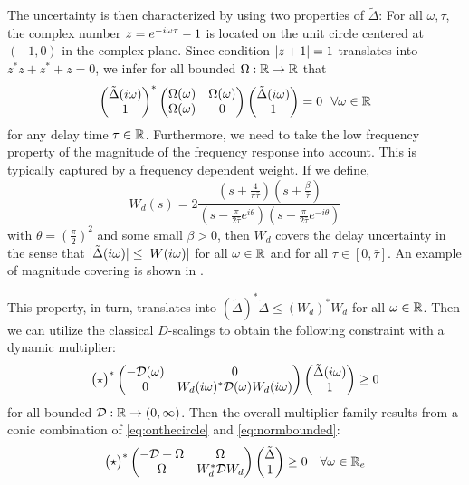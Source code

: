 The uncertainty is then characterized by using two properties of $\tilde \Delta$: For all 
$\omega,\tau$, the complex number $z=e^{-i\omega{\tau}}-1$ is located on the unit circle centered 
at $(-1,0)$ in the complex plane. Since condition $\displaystyle \left|z+1\right|=1$ translates into $z^*z+z^*+z=0$, 
we infer for all bounded $\Omega:\mathbb{R}\to\mathbb{R}$ that
\begin{equation}
\begin{pmatrix}\tilde{\Delta}(i\omega)\\1\end{pmatrix}^*\begin{pmatrix}\Omega(\omega) &\Omega(\omega)\\ \Omega(\omega) &0\end{pmatrix}
\begin{pmatrix}\tilde{\Delta}(i\omega)\\1\end{pmatrix} = 0\ \ \forall\omega\in\mathbb{R}
\label{eq:onthecircle}
\end{equation}
for any delay time $\tau\in\mathbb{R}$. Furthermore, we need to take the low frequency property of the 
magnitude of the frequency response into account. This is typically captured by a frequency dependent 
weight. If we define,
\begin{equation*}
W_d(s)= 2\frac{(s+ \frac{4}{\pi\bar{\tau}}) (s+ \frac{\beta}{\bar{\tau}})}%
{(s-\frac{\pi}{2\bar{\tau}}e^{i\theta})(s-\frac{\pi}{2\bar{\tau}}e^{-i\theta})}
\end{equation*}
with $\theta=\left( \frac{\pi}{2}\right)^2$ and some small $\beta>0$, then $W_d$ covers the delay 
uncertainty in the sense that $|\tilde{\Delta}(i\omega)|\leq |W(i\omega)|$ for all $\omega\in\mathbb{R}$ and 
for all $\tau\in [0,\bar{\tau}]$. An example of magnitude covering is shown in .

This property, in turn, translates into $(\tilde{\Delta})^*\tilde{\Delta}\leq (W_d)^*W_d$ for all 
$\omega\in\mathbb{R}$. Then we can utilize the classical $D$-scalings to obtain the following constraint 
with a dynamic multiplier:
\begin{equation}
\begin{pmatrix}\star\end{pmatrix}^*\begin{pmatrix}-\mathcal{D}(\omega) &0\\0 &W_d(i\omega)^*\mathcal{D}(\omega)W_d(i\omega)\end{pmatrix}
\begin{pmatrix}\tilde{\Delta}(i\omega)\\1\end{pmatrix} \geq 0
\label{eq:normbounded}
\end{equation}
for all bounded $\mathcal{D}:\mathbb{R}\to (0,\infty)$. Then the overall multiplier family results from a 
conic combination of \eqref{eq:onthecircle} and \eqref{eq:normbounded}:
\[
\begin{pmatrix}\star\end{pmatrix}^*\begin{pmatrix}-\mathcal{D}+\Omega &\Omega\\
\Omega &W_d^*\mathcal{D}W_d\end{pmatrix}\begin{pmatrix}\tilde{\Delta}\\1\end{pmatrix}
\geq 0 \quad \forall\omega\in\mathbb{R}_e
\]


